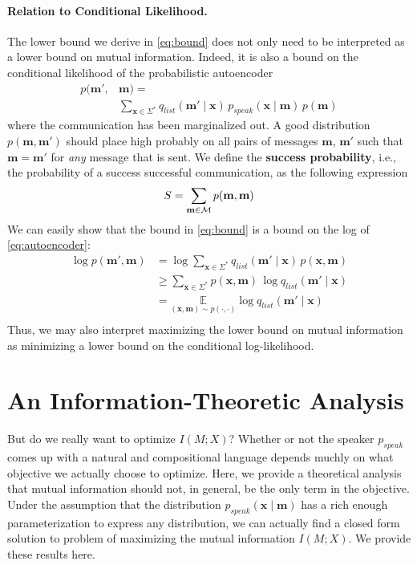 \documentclass[11pt,a4paper]{article}
\newcommand{\xx}{\mathbf{x}}
\newcommand{\mm}{\mathbf{m}}
\newcommand{\qlist}{q_{\textit{list}}}
\newcommand{\pspeak}{p_{\textit{speak}}}
\newcommand{\defn}[1]{\textbf{#1}}
\newcommand{\calM}{{\cal M}}
\begin{document}
\paragraph{Relation to Conditional Likelihood.}
The lower bound we derive in \cref{eq:bound} does not only need to be interpreted as a lower bound on mutual information. Indeed, it is also a bound on the conditional likelihood of
the probabilistic autoencoder
\begin{align}
  p(\mm', &\mm) = \label{eq:autoencoder} \\ 
&  \sum_{\xx \in \Sigma^*}\qlist(\mm' \mid \xx)\, \pspeak(\xx \mid \mm)\, p(\mm) \nonumber
\end{align}
where the communication has been marginalized out. A good
distribution $p(\mm, \mm')$ should place high probably
on all pairs of messages $\mm$, $\mm'$ such that $\mm = \mm'$ for \emph{any}
message that is sent.
We define the \defn{success probability}, i.e., the probability of a success successful communication, as the following expression
\begin{equation}
 S = \sum_{\mm \in \calM} p(\mm, \mm)
\end{equation}
We can easily show that the bound in \cref{eq:bound} is a bound on the log of \cref{eq:autoencoder}:
\begin{align*}
\log p(\mm', \mm) &= \log \sum_{\xx \in \Sigma^*}\qlist(\mm' \mid \xx)\, p(\xx, \mm) \\
&\geq \sum_{\xx \in \Sigma^*} p(\xx, \mm)\, \log \qlist(\mm' \mid \xx) \\
&= \underset{(\xx, \mm) \sim p(\cdot, \cdot)}{\mathbb{E}} \log \qlist(\mm' \mid \xx) \\
\end{align*}
Thus, we may also interpret maximizing the lower bound on mutual information as minimizing a lower bound on the conditional log-likelihood. 


\section{An Information-Theoretic Analysis}\label{sec:analysis}
But do we really want to optimize $I(M; X)$?
Whether or not the speaker $\pspeak$ comes up with a natural and compositional language depends muchly on what objective we actually choose to optimize. Here, we provide a theoretical analysis that mutual information should not, in general, be
the only term in the objective. 
Under the assumption that the distribution $\pspeak(\xx \mid \mm)$ has a rich enough parameterization to express any distribution, we can actually find a closed form solution to problem of maximizing the mutual information $I(M; X)$. We provide these results here. 
\end{document}
